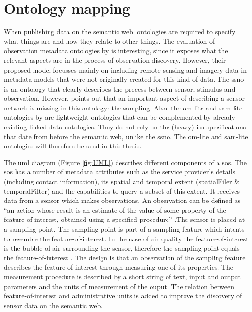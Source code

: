 \section{Ontology mapping}
When publishing data on the semantic web, ontologies are required to specify what things are and how they relate to other things. The evaluation of observation metadata ontologies by \cite{SW:Hu} is interesting, since it exposes what the relevant aspects are in the process of observation discovery. However, their proposed model focusses mainly on including remote sensing and imagery data in metadata models that were not originally created for this kind of data. The \ac{ssno} is an ontology that clearly describes the process between sensor, stimulus and observation. However, \cite{SSW:Cox4} points out that an important aspect of describing a sensor network is missing in this ontology: the sampling. Also, the om-lite and sam-lite ontologies by \cite{SSW:Cox4} are lightweight ontologies that can be complemented by already existing linked data ontologies. They do not rely on the (heavy) \ac{iso} specifications that date from before the semantic web, unlike the \ac{ssno}. The om-lite and sam-lite ontologies will therefore be used in this thesis. 

The \ac{uml} diagram (Figure \ref{fig:UML}) describes different components of a \ac{sos}. The \ac{sos} has a number of metadata attributes such as the service provider's details (including contact information), its spatial and temporal extent (spatialFiler \& temporalFilter) and the capabilities to query a subset of this extent. It receives data from a sensor which makes observations. An observation can be defined as \enquote{an action whose result is an estimate of the value of some property of the feature-of-interest, obtained using a specified procedure} \citep{SSW:Cox3}.The sensor is placed at a sampling point. The sampling point is part of a sampling feature which intents to resemble the feature-of-interest. In the case of air quality the feature-of-interest is the bubble of air surrounding the sensor, therefore the sampling point equals the feature-of-interest \citep{SDI:INSPIRE2}. The design is that an observation of the sampling feature describes the  feature-of-interest through measuring one of its properties. The measurement procedure is described by a short string of text, input and output parameters and the units of measurement of the ouput. The relation between feature-of-interest and administrative units is added to improve the discovery of sensor data on the semantic web. 

